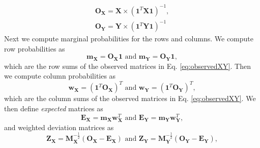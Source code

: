 \documentclass[12pt]{article}
\begin{document}
\begin{equation}
\begin{aligned}
{\mathbf O}_{\mathbf X} = {\mathbf X} \times ({\mathbf 1}^{T}{\mathbf X} {\mathbf 1})^{-1}, \\
{\mathbf O}_{\mathbf Y} = {\mathbf Y} \times ({\mathbf 1}^{T}{\mathbf Y} {\mathbf 1})^{-1}
\label{eq:observedXY}
\end{aligned}
\end{equation} Next we compute marginal probabilities for the rows and
columns. We compute row probabilities as \begin{equation}
{\mathbf m}_{\mathbf X} = {\mathbf O}_{\mathbf X}{\mathbf 1} \text{ and } {\mathbf m}_{\mathbf Y} = {\mathbf O}_{\mathbf Y}{\mathbf 1},
\label{eq:xy_rowvecs}
\end{equation} which are the row sums of the observed matrices in Eq.
\ref{eq:observedXY}. Then we compute column probabilities as
\begin{equation}
{\mathbf w}_{\mathbf X} = ({\mathbf 1}^{T}{\mathbf O}_{\mathbf X})^{T} \text{ and } {\mathbf w}_{\mathbf Y} = ({\mathbf 1}^{T}{\mathbf O}_{\mathbf Y})^{T},
\label{eq:weightmats_v1}
\end{equation} which are the column sums of the observed matrices in Eq.
\ref{eq:observedXY}. We then define \emph{expected} matrices as
\begin{equation}
{\mathbf E}_{\mathbf X} = {\mathbf m}_{\mathbf X}{\mathbf w}_{\mathbf X}^{T} \text{ and } {\mathbf E}_{\mathbf Y} = {\mathbf m}_{\mathbf Y}{\mathbf w}_{\mathbf Y}^{T},
\label{eq:models}
\end{equation} and weighted deviation matrices as \begin{equation}
{\mathbf Z}_{\mathbf X} = {\mathbf M}_{\mathbf X}^{-\frac{1}{2}} ({\mathbf O}_{\mathbf X} - {\mathbf E}_{\mathbf X}) \text{ and } {\mathbf Z}_{\mathbf Y} = {\mathbf M}_{\mathbf Y}^{-\frac{1}{2}}({\mathbf O}_{\mathbf Y} - {\mathbf E}_{\mathbf Y}),
\label{eq:plscar_Zs}
\end{equation}
\end{document}
